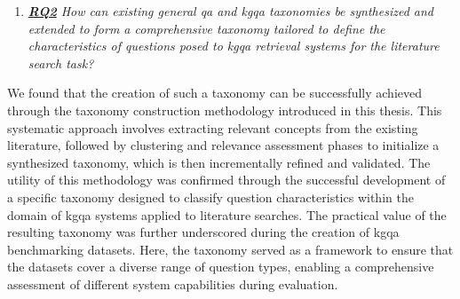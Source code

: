 \begin{enumerate}[label={}]
    \item \textit{\hyperref[enum:rq2]{\textbf{RQ2}} How can existing general \gls{qa} and \gls{kgqa} taxonomies be synthesized and extended to form a comprehensive taxonomy tailored to define the characteristics of questions posed to \gls{kgqa} retrieval systems for the literature search task?}
\end{enumerate}
We found that the creation of such a taxonomy can be successfully achieved through the taxonomy construction methodology introduced in this thesis. This systematic approach involves extracting relevant concepts from the existing literature, followed by clustering and relevance assessment phases to initialize a synthesized taxonomy, which is then incrementally refined and validated. The utility of this methodology was confirmed through the successful development of a specific taxonomy designed to classify question characteristics within the domain of \gls{kgqa} systems applied to literature searches. The practical value of the resulting taxonomy was further underscored during the creation of \gls{kgqa} benchmarking datasets. Here, the taxonomy served as a framework to ensure that the datasets cover a diverse range of question types, enabling a comprehensive assessment of different system capabilities during evaluation.
